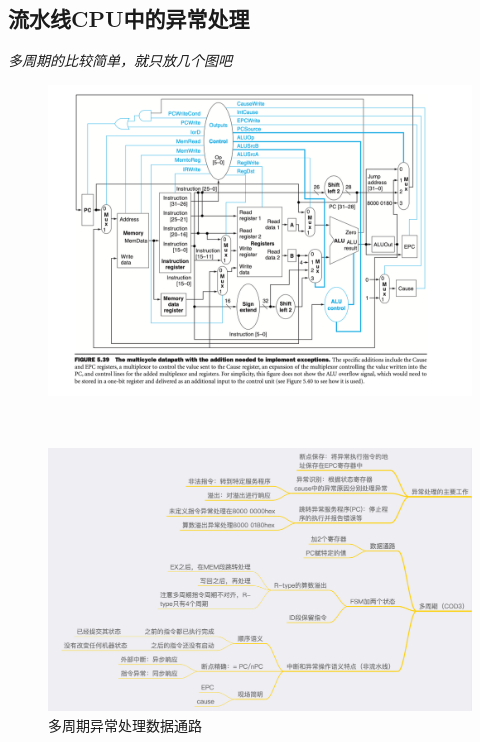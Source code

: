 \documentclass[]{report}
\begin{document}
	\subsection{流水线CPU中的异常处理}
		\textit{多周期的比较简单，就只放几个图吧}\newline
		\begin{figure}[h]
			\centering
			\begin{minipage}{20em}
				\centering
				\begin{minipage}{20em}
					\centering
					\includegraphics[scale = 0.14]{images/MultiCycle_Exceptions.png}
					\caption{多周期异常处理数据通路}
				\end{minipage}
				\\[10pt]
				\begin{minipage}{20em}
					\centering
					\includegraphics[scale = 0.13]{images/MultiCycle_Exceptions_MindNode.png}

\end{minipage}
\end{minipage}
\end{figure}
\end{document}
